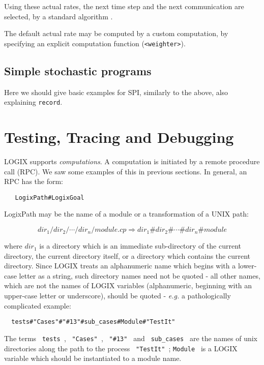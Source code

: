 Using these actual rates, the next time step and the next
communication are selected, by a standard algorithm \cite{Gil77}.

The default actual rate may be computed by a custom computation,
by specifying an explicit computation function (\verb+<weighter>+).

\section{Simple stochastic programs}

Here we should give basic examples for SPI, similarly to
the above, also explaining \verb+record+.


\chapter{Testing, Tracing and Debugging}
\label{debug}

LOGIX supports {\em computations}.  A computation is initiated by
a remote procedure call (RPC).  We saw some examples of this in
previous sections.  In general, an RPC has the form:

\begin{verbatim}
   LogixPath#LogixGoal
\end{verbatim}

\noindent
LogixPath may be the name of a module or a transformation of a UNIX path:

\[dir_{1}/dir_{2}/ \cdots /dir_{n}/module.cp  \Rightarrow  dir_{1}\#dir_{2}\# \cdots \#dir_{n}\#module\]

\noindent
where $dir_{1}$ is a directory which is an immediate sub-directory
of the current directory, the current directory itself, or a directory
which contains the current directory.
Since LOGIX treats an alphanumeric name which begins with a lower-case
letter as a string, such directory names need not be quoted - all
other names, which are not the names of LOGIX variables (alphanumeric,
beginning with an upper-case letter or underscore), should be quoted -
{\em e.g.} a pathologically complicated example:

\begin{verbatim}
  tests#"Cases"#"#13"#sub_cases#Module#"TestIt"
\end{verbatim}

\noindent
The terms \verb+ tests +, \verb+ "Cases" +, \verb+ "#13" + and
\verb+ sub_cases + are the names of unix directories along the
path to the process  \verb+ "TestIt" +;
\verb+Module + is a LOGIX variable which should be instantiated to a
module name.

